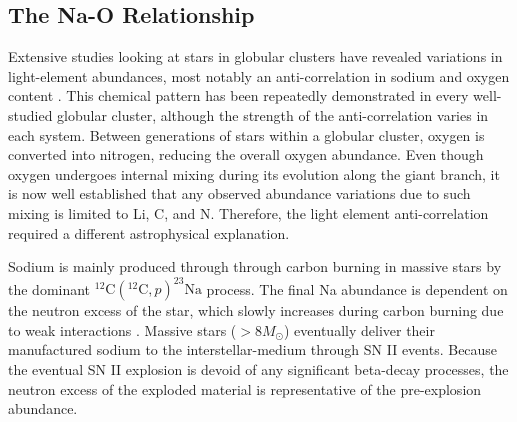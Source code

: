 \documentclass{emulateapj}
\begin{document}





\subsection{The Na-O Relationship}


Extensive studies looking at stars in globular clusters have revealed variations in light-element abundances, most notably an anti-correlation in sodium and oxygen content \citet[][and references therein]{norris;da_costa_1995,carretta;et-al_2009_na_o}. This chemical pattern has been repeatedly demonstrated in every well-studied globular cluster, although the strength of the anti-correlation varies in each system. Between generations of stars within a globular cluster, oxygen is converted into nitrogen, reducing the overall oxygen abundance. Even though oxygen undergoes internal mixing during its evolution along the giant branch, it is now well established that any observed abundance variations due to such mixing is limited to Li, C, and N. Therefore, the light element anti-correlation required a different astrophysical explanation.

Sodium is mainly produced through through carbon burning in massive stars by the dominant $^{12}\mbox{C}(^{12}\mbox{C}, p)^{23}\mbox{Na}$ process. The final Na abundance is dependent on the neutron excess of the star, which slowly increases during carbon burning due to weak interactions \citep{arnett;truran_1974}. Massive stars ($>8 M_\odot$) eventually deliver their manufactured sodium to the interstellar-medium through SN II events. Because the eventual SN II explosion is devoid of any significant beta-decay processes, the neutron excess of the exploded material is representative of the pre-explosion abundance.  
  
\end{document}
